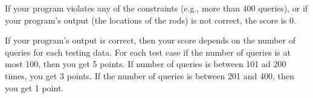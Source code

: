 If your program violates any of the constraints (e.g., more than 400 queries), or if
your program's output (the locations of the rods) is not correct, the score is 0.

If your program's output is correct, then your score depends on the number of queries
for each testing data. For each test case if the number of queries is at most 100,
then you get 5 points. If number of queries is between 101 ad 200 times, you get 3 points. If the number of queries is between 201 and 400, then you get 1 point.
